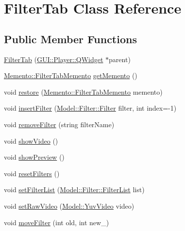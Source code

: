 \hypertarget{classGUI_1_1FilterTab}{}\section{Filter\+Tab Class Reference}
\label{classGUI_1_1FilterTab}
\subsection*{Public Member Functions}
\begin{DoxyCompactItemize}
\item 
\hyperlink{classGUI_1_1FilterTab_a46622cba9213a399b4b249dc276d4bd3}{Filter\+Tab} (\hyperlink{classGUI_1_1Player_1_1QWidget}{G\+U\+I\+::\+Player\+::\+Q\+Widget} $\ast$parent)
\item 
\hyperlink{classMemento_1_1FilterTabMemento}{Memento\+::\+Filter\+Tab\+Memento} \hyperlink{classGUI_1_1FilterTab_a7fc8423cb1fbba94b4f339ce1695312b}{get\+Memento} ()
\item 
void \hyperlink{classGUI_1_1FilterTab_a5ac565cc700848f69b7b30b83f9b7269}{restore} (\hyperlink{classMemento_1_1FilterTabMemento}{Memento\+::\+Filter\+Tab\+Memento} memento)
\item 
void \hyperlink{classGUI_1_1FilterTab_a3018fe1fa10050f141ca3e119e8b8836}{insert\+Filter} (\hyperlink{classModel_1_1Filter_1_1Filter}{Model\+::\+Filter\+::\+Filter} filter, int index=-\/1)
\item 
void \hyperlink{classGUI_1_1FilterTab_afbcb1308b246ae3f3008dd9854e1b276}{remove\+Filter} (string filter\+Name)
\item 
void \hyperlink{classGUI_1_1FilterTab_a8183c3773c11241bede44cedb223555f}{show\+Video} ()
\item 
void \hyperlink{classGUI_1_1FilterTab_a683e97e8ce40844fdccefc091a0e678e}{show\+Preview} ()
\item 
void \hyperlink{classGUI_1_1FilterTab_a4e238a9564770214fb84f0d542e846dc}{reset\+Filters} ()
\item 
void \hyperlink{classGUI_1_1FilterTab_a959433e6472c35f5c5e0135f269dbba0}{set\+Filter\+List} (\hyperlink{classModel_1_1Filter_1_1FilterList}{Model\+::\+Filter\+::\+Filter\+List} list)
\item 
void \hyperlink{classGUI_1_1FilterTab_ae01a11c0a081e873c992ebb245295903}{set\+Raw\+Video} (\hyperlink{classModel_1_1YuvVideo}{Model\+::\+Yuv\+Video} video)
\item 
void \hyperlink{classGUI_1_1FilterTab_a97ba0aa0c950aa895489093bbc6264f6}{move\+Filter} (int old, int new\+\_)
\end{DoxyCompactItemize}
